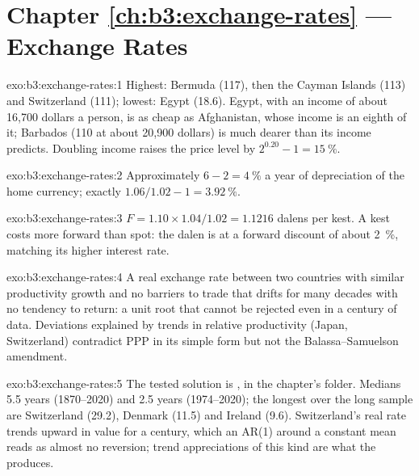 \section*{Chapter \ref{ch:b3:exchange-rates} --- Exchange Rates}

\begin{solution}{exo:b3:exchange-rates:1}
Highest: Bermuda (117), then the Cayman Islands (113) and Switzerland (111); lowest:
Egypt (18.6). Egypt, with an income of about 16{,}700 dollars a person, is as cheap
as Afghanistan, whose income is an eighth of it; Barbados (110 at about 20{,}900
dollars) is much dearer than its income predicts. Doubling income raises the
price level by $2^{0.20} - 1 = 15~\%$. %
\end{solution}

\begin{solution}{exo:b3:exchange-rates:2}
Approximately $6 - 2 = 4~\%$ a year of depreciation of the home currency; exactly
$1.06/1.02 - 1 = 3.92~\%$.
\end{solution}

\begin{solution}{exo:b3:exchange-rates:3}
$F = 1.10 \times 1.04/1.02 = 1.1216$ dalens per kest. A kest costs more forward than
spot: the dalen is at a forward discount of about 2~\%, matching its higher
interest rate.
\end{solution}

\begin{solution}{exo:b3:exchange-rates:4}
A real exchange rate between two countries with similar productivity growth and
no barriers to trade that drifts for many decades with no tendency to return: a
unit root that cannot be rejected even in a century of data. Deviations explained
by trends in relative productivity (Japan, Switzerland) contradict PPP in its
simple form but not the Balassa--Samuelson amendment.
\end{solution}

\begin{solution}{exo:b3:exchange-rates:5}
The tested solution is , in the chapter's
 folder. Medians 5.5 years (1870--2020) and 2.5 years (1974--2020); the
longest over the long sample are Switzerland (29.2), Denmark (11.5) and Ireland
(9.6). %
Switzerland's real rate trends upward in value for a century, which an AR(1)
around a constant mean reads as almost no reversion; trend appreciations of this
kind are what the  produces.
\end{solution}

